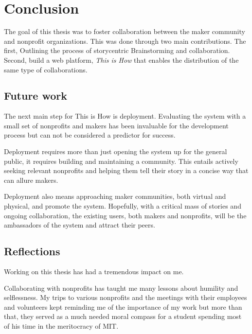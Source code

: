 
\chapter{Conclusion}
\label{chap_conclusion}

The goal of this thesis was to foster collaboration between the maker community and nonprofit organizations. This was done through two main contributions. The first, Outlining the process of story­centric Brainstorming and collaboration. Second, build a web platform, \textit{This is How} that enables the distribution of the same type of collaborations.

\section{Future work}

The next main step for This is How is deployment. Evaluating the system with a small set of nonprofits and makers has been invaluable for the development process but can not be considered a predictor for success.

Deployment requires more than just opening the system up for the general public, it requires building and maintaining a community. This entails actively seeking relevant nonprofits and helping them tell their story in a concise way that can allure makers. 

Deployment also means approaching maker communities, both virtual and physical, and promote the system. Hopefully, with a critical mass of stories and ongoing collaboration, the existing users, both makers and nonprofits, will be the ambassadors of the system and attract their peers.

\section{Reflections}

Working on this thesis has had a tremendous impact on me.

Collaborating with nonprofits has taught me many lessons about humility and selflessness. My trips to various nonprofits and the meetings with their employees and volunteers kept reminding me of the importance of my work but more than that, they served as a much needed moral compass for a student spending most of his time in the meritocracy of MIT.

